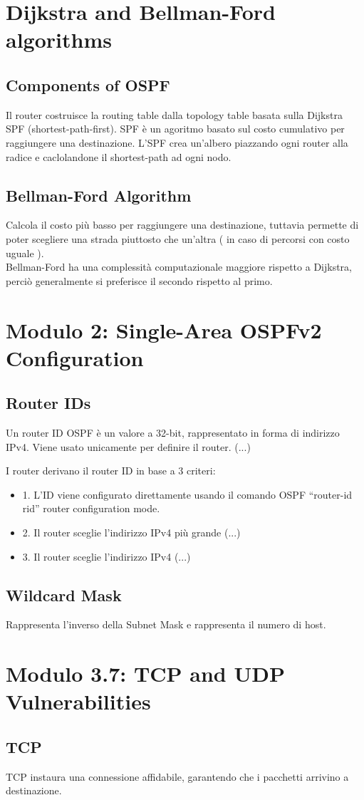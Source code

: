 \documentclass[12pt, a4paper]{article}
\begin{document}
	
	
	\section*{Dijkstra and Bellman-Ford algorithms}

	\subsection*{Components of OSPF}
	
	Il router costruisce la routing table dalla topology table basata sulla Dijkstra SPF (shortest-path-first). SPF è un agoritmo basato sul costo cumulativo per raggiungere una destinazione. L'SPF crea un'albero piazzando ogni router alla radice e caclolandone il shortest-path ad ogni nodo. 
	
	\subsection*{Bellman-Ford Algorithm}
	
	Calcola il costo più basso per raggiungere una destinazione, tuttavia permette di poter scegliere una strada piuttosto che un'altra ( in caso di percorsi con costo uguale ). \\ Bellman-Ford ha una complessità computazionale maggiore rispetto a Dijkstra, perciò generalmente si preferisce il secondo rispetto al primo.
	
	
	
	\section*{Modulo 2: Single-Area OSPFv2 Configuration}
	
	\subsection*{Router IDs}
	
	Un router ID OSPF è un valore a 32-bit, rappresentato in forma di indirizzo IPv4. Viene usato unicamente per definire il router. (...)
	
	I router derivano il router ID in base a 3 criteri:
	\begin{itemize}
		\item 1. L'ID viene configurato direttamente usando il comando OSPF ``router-id rid'' router configuration mode.
		\item 2. Il router sceglie l'indirizzo IPv4 più grande (...)
		\item 3. Il router sceglie l'indirizzo IPv4 (...)
	\end{itemize}
	
	\subsection*{Wildcard Mask}
	
	Rappresenta l'inverso della Subnet Mask e rappresenta il numero di host.
	
	
	\section*{Modulo 3.7: TCP and UDP Vulnerabilities}
	
	\subsection*{TCP}
	TCP instaura una connessione affidabile, garantendo che i pacchetti arrivino a destinazione. 
	
	
\end{document}

